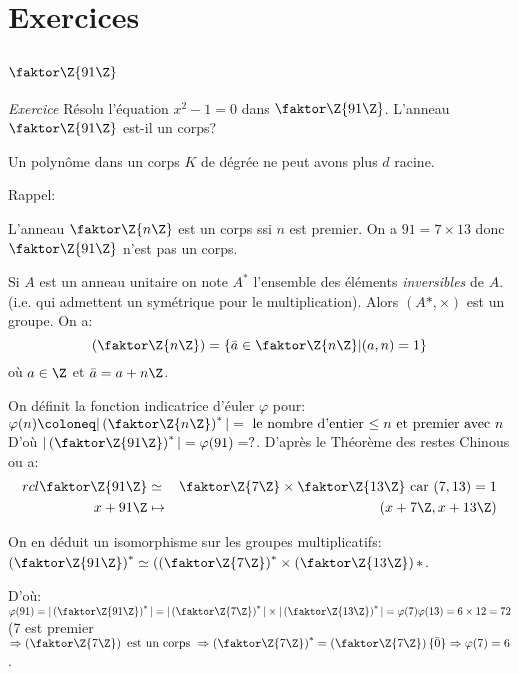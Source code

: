 
\chapter{Exercices}

\section{$\faktor\Z{91\Z}$}

\emph{Exercice}
Résolu l'équation $x^2-1=0$ dans $\faktor\Z{91\Z}$. L'anneau $\faktor\Z{91\Z}$ est-il un corps?
\begin{remark}
	Un polynôme dans un corps $K$ de dégrée ne peut avons plus $d$ racine.
\end{remark}

Rappel:

L'anneau $\faktor\Z{n\Z}$ est un corps ssi $n$ est premier. On a $91=7\times 13$ donc $\faktor\Z{91\Z}$ n'est pas un corps.

Si $A$ est un anneau unitaire on note $A^{\ast}$ l'ensemble des éléments \emph{inversibles} de $A$. (i.e. qui admettent un symétrique pour le multiplication). Alors $(A\ast,\times)$ est un groupe. On a:
$$(\faktor\Z{n\Z})=\{\bar a\in \faktor\Z{n\Z}|(a,n)=1\}$$ où $a\in\Z$ et $\bar a=a+n\Z$.

On définit la fonction indicatrice d'éuler $\varphi $ pour: $\varphi (n)\coloneq|\left(\faktor\Z{n\Z}\right)^\ast|=\mbox{ le nombre d'entier $\leq n$ et premier avec $n$}$ D'où $|\left(\faktor\Z{91\Z}\right)^\ast|=\varphi (91)=?$. D'après le Théorème des restes Chinous ou a:
\begin{align}{rcl}
	\faktor\Z{91\Z} &\simeq& \faktor\Z{7\Z}\times \faktor\Z{13\Z}\text{ car } (7,13)=1\\
	x+91\Z &\mapsto& (x+7\Z,x+13\Z)
\end{align}

On en déduit un isomorphisme sur les groupes multiplicatifs: $\left(\faktor\Z{91\Z}\right)^\ast\simeq(\left(\faktor\Z{7\Z}\right)^\ast\times \left(\faktor\Z{13\Z}\right)
\ast$. 

D'où: $\varphi (91)=|\left(\faktor\Z{91\Z}\right)^\ast |=|\left(\faktor\Z{7\Z}\right)^\ast|\times|\left(\faktor\Z{13\Z}\right)^\ast|= \varphi (7)\varphi (13)=6\times 12=72$
(7 est premier $\Rightarrow \left(\faktor\Z{7\Z}\right) \text{ est un corps } \Rightarrow \left(\faktor\Z{7\Z}\right)^\ast=\left(\faktor\Z{7\Z}\right)\\ \{\bar 0\} \Rightarrow \varphi (7)=6$.

